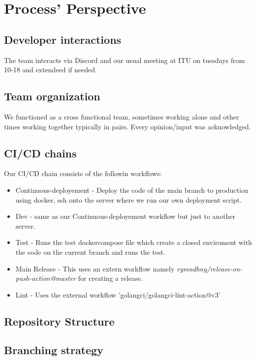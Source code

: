 \section{Process' Perspective}

\subsection{Developer interactions}
The team interacts via Discord and our usual meeting at ITU on tuesdays from 10-18 and extendeed if needed.

\subsection{Team organization}
We functioned as a cross functional team, sometimes working alone and other times working together typically in pairs. Every opinion/input was acknowledged. 

\subsection{CI/CD chains}
Our CI/CD chain consists of the followin workflows:
\begin{itemize}
    \item Continuous-deployement - Deploy the code of the main branch to production using docker, ssh onto the server where we run our own deployment script.
    \item Dev - same as our Continuous-deployement workflow but just to another server.
    \item Test - Runs the test dockercompose file which create a closed enviroment with the code on the current branch and runs the test.
    \item Main Release - This uses an extern workflow namely \textit{rymndhng/release-on-push-action@master} for creating a release.
    \item Lint - Uses the external workflow 'golangci/golangci-lint-action@v3'
\end{itemize}

\subsection{Repository Structure}

\subsection{Branching strategy}

